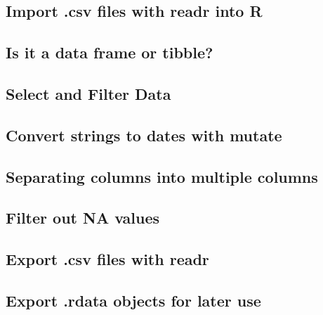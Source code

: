 \documentclass[
]{article}
\begin{document}
\hypertarget{import-.csv-files-with-readr-into-r}{%
\subsection{Import .csv files with readr into R}\label{import-.csv-files-with-readr-into-r}}

\hypertarget{is-it-a-data-frame-or-tibble}{%
\subsection{Is it a data frame or tibble?}\label{is-it-a-data-frame-or-tibble}}

\hypertarget{select-and-filter-data}{%
\subsection{Select and Filter Data}\label{select-and-filter-data}}

\hypertarget{convert-strings-to-dates-with-mutate}{%
\subsection{Convert strings to dates with mutate}\label{convert-strings-to-dates-with-mutate}}

\hypertarget{separating-columns-into-multiple-columns}{%
\subsection{Separating columns into multiple columns}\label{separating-columns-into-multiple-columns}}

\hypertarget{filter-out-na-values}{%
\subsection{Filter out NA values}\label{filter-out-na-values}}

\hypertarget{export-.csv-files-with-readr}{%
\subsection{Export .csv files with readr}\label{export-.csv-files-with-readr}}

\hypertarget{export-.rdata-objects-for-later-use}{%
\subsection{Export .rdata objects for later use}\label{export-.rdata-objects-for-later-use}}
\end{document}
